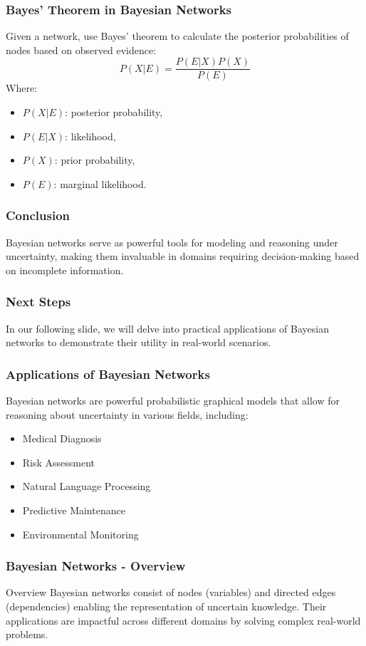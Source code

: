 \documentclass[aspectratio=169]{beamer}
\begin{document}
\begin{frame}[fragile]
    \frametitle{Bayes' Theorem in Bayesian Networks}
    Given a network, use Bayes' theorem to calculate the posterior probabilities of nodes based on observed evidence:
    \begin{equation}
    P(X | E) = \frac{P(E | X) P(X)}{P(E)}
    \end{equation}
    Where:
    \begin{itemize}
        \item \( P(X | E) \): posterior probability,
        \item \( P(E | X) \): likelihood,
        \item \( P(X) \): prior probability,
        \item \( P(E) \): marginal likelihood.
    \end{itemize}
\end{frame}

\begin{frame}[fragile]
    \frametitle{Conclusion}
    Bayesian networks serve as powerful tools for modeling and reasoning under uncertainty, making them invaluable in domains requiring decision-making based on incomplete information.
\end{frame}

\begin{frame}[fragile]
    \frametitle{Next Steps}
    In our following slide, we will delve into practical applications of Bayesian networks to demonstrate their utility in real-world scenarios.
\end{frame}

\begin{frame}[fragile]
    \frametitle{Applications of Bayesian Networks}
    Bayesian networks are powerful probabilistic graphical models that allow for reasoning about uncertainty in various fields, including:
    \begin{itemize}
        \item Medical Diagnosis
        \item Risk Assessment
        \item Natural Language Processing
        \item Predictive Maintenance
        \item Environmental Monitoring
    \end{itemize}
\end{frame}

\begin{frame}[fragile]
    \frametitle{Bayesian Networks - Overview}
    \begin{block}{Overview}
        Bayesian networks consist of nodes (variables) and directed edges (dependencies) enabling the representation of uncertain knowledge. Their applications are impactful across different domains by solving complex real-world problems.
    \end{block}
\end{frame}
\end{document}

